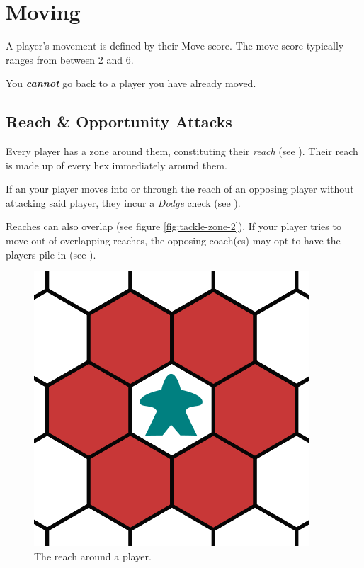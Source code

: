 \section{Moving} \label{moving}
A player's movement is defined by their Move score.
The move score typically ranges from between 2 and 6.

\begin{note}
    You \textit{\textbf{cannot}} go back to a player you have already moved.
\end{note}

\subsection{Reach \& Opportunity Attacks}
Every player has a zone around them, constituting their \textit{reach} (see ).
Their reach is made up of every hex immediately around them.

If an your player moves into or through the reach of an opposing player without attacking said player, they incur a \textit{Dodge} check (see ).

\begin{note}
    Reaches can also overlap (see figure \ref{fig:tackle-zone-2}).
    If your player tries to move out of overlapping reaches, the opposing coach(es) may opt to have the players pile in (see ).
\end{note}

\begin{figure}
    \centering
    \includegraphics{graphics/tackle-zones-1.png}
    \caption{The reach around a player.}
    \label{fig:tackle-zone-1}
\end{figure}

